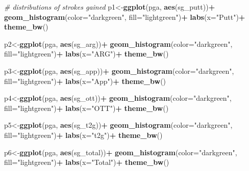 \documentclass[
]{article}
\newenvironment{Shaded}{\begin{snugshade}}{\end{snugshade}}
\newcommand{\CommentTok}[1]{\textcolor[rgb]{0.56,0.35,0.01}{\textit{#1}}}
\newcommand{\DataTypeTok}[1]{\textcolor[rgb]{0.13,0.29,0.53}{#1}}
\newcommand{\KeywordTok}[1]{\textcolor[rgb]{0.13,0.29,0.53}{\textbf{#1}}}
\newcommand{\NormalTok}[1]{#1}
\newcommand{\OperatorTok}[1]{\textcolor[rgb]{0.81,0.36,0.00}{\textbf{#1}}}
\newcommand{\StringTok}[1]{\textcolor[rgb]{0.31,0.60,0.02}{#1}}
\begin{document}
\begin{Shaded}
\begin{Highlighting}[]
\CommentTok{# distributions of strokes gained}
\NormalTok{p1<-}\KeywordTok{ggplot}\NormalTok{(pga, }\KeywordTok{aes}\NormalTok{(sg_putt))}\OperatorTok{+}
\StringTok{  }\KeywordTok{geom_histogram}\NormalTok{(}\DataTypeTok{color=}\StringTok{"darkgreen"}\NormalTok{, }\DataTypeTok{fill=}\StringTok{"lightgreen"}\NormalTok{)}\OperatorTok{+}
\StringTok{  }\KeywordTok{labs}\NormalTok{(}\DataTypeTok{x=}\StringTok{"Putt"}\NormalTok{)}\OperatorTok{+}
\StringTok{  }\KeywordTok{theme_bw}\NormalTok{()}

\NormalTok{p2<-}\KeywordTok{ggplot}\NormalTok{(pga, }\KeywordTok{aes}\NormalTok{(sg_arg))}\OperatorTok{+}
\StringTok{  }\KeywordTok{geom_histogram}\NormalTok{(}\DataTypeTok{color=}\StringTok{"darkgreen"}\NormalTok{, }\DataTypeTok{fill=}\StringTok{"lightgreen"}\NormalTok{)}\OperatorTok{+}
\StringTok{  }\KeywordTok{labs}\NormalTok{(}\DataTypeTok{x=}\StringTok{"ARG"}\NormalTok{)}\OperatorTok{+}
\StringTok{  }\KeywordTok{theme_bw}\NormalTok{()}

\NormalTok{p3<-}\KeywordTok{ggplot}\NormalTok{(pga, }\KeywordTok{aes}\NormalTok{(sg_app))}\OperatorTok{+}
\StringTok{  }\KeywordTok{geom_histogram}\NormalTok{(}\DataTypeTok{color=}\StringTok{"darkgreen"}\NormalTok{, }\DataTypeTok{fill=}\StringTok{"lightgreen"}\NormalTok{)}\OperatorTok{+}
\StringTok{  }\KeywordTok{labs}\NormalTok{(}\DataTypeTok{x=}\StringTok{"App"}\NormalTok{)}\OperatorTok{+}
\StringTok{  }\KeywordTok{theme_bw}\NormalTok{()}

\NormalTok{p4<-}\KeywordTok{ggplot}\NormalTok{(pga, }\KeywordTok{aes}\NormalTok{(sg_ott))}\OperatorTok{+}
\StringTok{  }\KeywordTok{geom_histogram}\NormalTok{(}\DataTypeTok{color=}\StringTok{"darkgreen"}\NormalTok{, }\DataTypeTok{fill=}\StringTok{"lightgreen"}\NormalTok{)}\OperatorTok{+}
\StringTok{  }\KeywordTok{labs}\NormalTok{(}\DataTypeTok{x=}\StringTok{"OTT"}\NormalTok{)}\OperatorTok{+}
\StringTok{  }\KeywordTok{theme_bw}\NormalTok{()}

\NormalTok{p5<-}\KeywordTok{ggplot}\NormalTok{(pga, }\KeywordTok{aes}\NormalTok{(sg_t2g))}\OperatorTok{+}
\StringTok{  }\KeywordTok{geom_histogram}\NormalTok{(}\DataTypeTok{color=}\StringTok{"darkgreen"}\NormalTok{, }\DataTypeTok{fill=}\StringTok{"lightgreen"}\NormalTok{)}\OperatorTok{+}
\StringTok{  }\KeywordTok{labs}\NormalTok{(}\DataTypeTok{x=}\StringTok{"t2g"}\NormalTok{)}\OperatorTok{+}
\StringTok{  }\KeywordTok{theme_bw}\NormalTok{()}

\NormalTok{p6<-}\KeywordTok{ggplot}\NormalTok{(pga, }\KeywordTok{aes}\NormalTok{(sg_total))}\OperatorTok{+}
\StringTok{  }\KeywordTok{geom_histogram}\NormalTok{(}\DataTypeTok{color=}\StringTok{"darkgreen"}\NormalTok{, }\DataTypeTok{fill=}\StringTok{"lightgreen"}\NormalTok{)}\OperatorTok{+}
\StringTok{  }\KeywordTok{labs}\NormalTok{(}\DataTypeTok{x=}\StringTok{"Total"}\NormalTok{)}\OperatorTok{+}
\StringTok{  }\KeywordTok{theme_bw}\NormalTok{()}


\end{Highlighting}
\end{Shaded}
\end{document}
